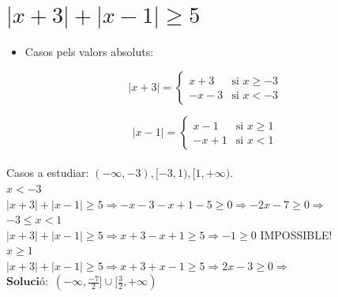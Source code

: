 \section{\texorpdfstring{$|x + 3| + |x- 1| \geq 5$}{|x + 3| + |x- 1| }}

\begin{itemize}
    \item Casos pels valors absoluts:
\end{itemize}

\[
|x + 3| = 
\begin{cases}
x + 3 & \text{si } x \geq -3 \\
- x - 3 & \text{si } x < -3
\end{cases}
\]

\[
|x - 1| = 
\begin{cases}
x - 1 & \text{si } x \geq 1 \\
-x + 1 & \text{si } x < 1
\end{cases}
\] \\

Casos a estudiar: $(-\infty, -3), [-3, 1), [1, +\infty)$.\\

$\boxed{x < -3}$ \\
$|x + 3| + |x - 1| \geq 5 \Rightarrow -x - 3 - x + 1 -5 \geq 0 \Rightarrow -2x - 7 \geq 0 \Rightarrow$  \\

$\boxed{-3 \leq x < 1}$ \\
$|x + 3| + |x -1| \geq 5 \Rightarrow x + 3 - x + 1 \geq 5 \Rightarrow -1 \geq 0$ IMPOSSIBLE! \\

$\boxed{ x \geq 1}$ \\
$|x + 3| + |x - 1| \geq 5 \Rightarrow x + 3 + x - 1 \geq 5 \Rightarrow 2x - 3 \geq 0 \Rightarrow$  \\

$\textbf{Solució: }\,(-\infty, \frac{-7}{2}] \cup [\frac{3}{2}, +\infty)$


